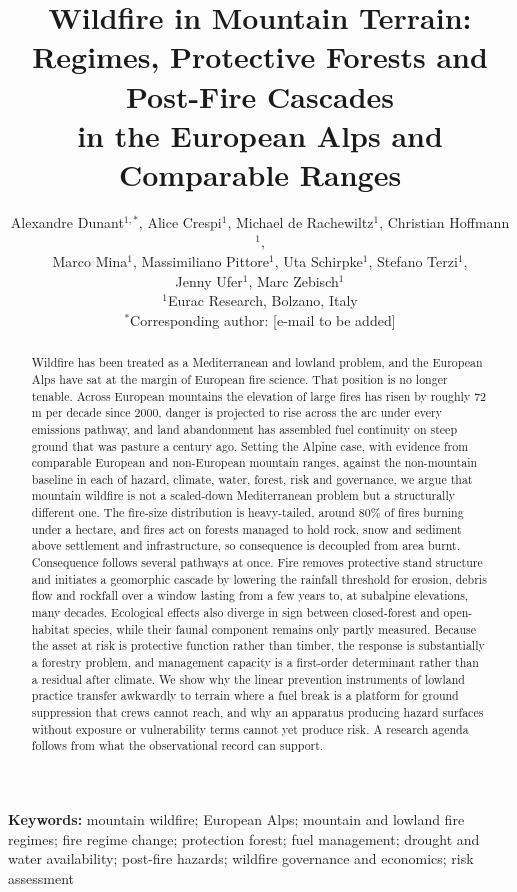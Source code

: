 \documentclass[11pt,a4paper]{article}
\title{
Wildfire in Mountain Terrain:\\
Regimes, Protective Forests and Post-Fire Cascades\\
in the European Alps and Comparable Ranges
}
\author{
Alexandre Dunant$^{1,*}$, Alice Crespi$^{1}$, Michael de Rachewiltz$^{1}$, Christian Hoffmann$^{1}$,\\
Marco Mina$^{1}$, Massimiliano Pittore$^{1}$, Uta Schirpke$^{1}$, Stefano Terzi$^{1}$,\\
Jenny Ufer$^{1}$, Marc Zebisch$^{1}$ \\
\small $^{1}$Eurac Research, Bolzano, Italy \\
\small $^{*}$Corresponding author: [e-mail to be added]
}
\date{}
\begin{document}
\maketitle


\begin{abstract}
\noindent
Wildfire has been treated as a Mediterranean and lowland problem, and the European Alps have sat at the margin of European fire science. That position is no longer tenable. Across European mountains the elevation of large fires has risen by roughly 72\,m per decade since 2000, danger is projected to rise across the arc under every emissions pathway, and land abandonment has assembled fuel continuity on steep ground that was pasture a century ago. Setting the Alpine case, with evidence from comparable European and non-European mountain ranges, against the non-mountain baseline in each of hazard, climate, water, forest, risk and governance, we argue that mountain wildfire is not a scaled-down Mediterranean problem but a structurally different one. The fire-size distribution is heavy-tailed, around 80\% of fires burning under a hectare, and fires act on forests managed to hold rock, snow and sediment above settlement and infrastructure, so consequence is decoupled from area burnt. Consequence follows several pathways at once. Fire removes protective stand structure and initiates a geomorphic cascade by lowering the rainfall threshold for erosion, debris flow and rockfall over a window lasting from a few years to, at subalpine elevations, many decades. Ecological effects also diverge in sign between closed-forest and open-habitat species, while their faunal component remains only partly measured. Because the asset at risk is protective function rather than timber, the response is substantially a forestry problem, and management capacity is a first-order determinant rather than a residual after climate. We show why the linear prevention instruments of lowland practice transfer awkwardly to terrain where a fuel break is a platform for ground suppression that crews cannot reach, and why an apparatus producing hazard surfaces without exposure or vulnerability terms cannot yet produce risk. A research agenda follows from what the observational record can support.
\end{abstract}

\noindent\textbf{Keywords:}
mountain wildfire; European Alps; mountain and lowland fire regimes; fire regime change; protection forest; fuel management; drought and water availability; post-fire hazards; wildfire governance and economics; risk assessment
\end{document}
